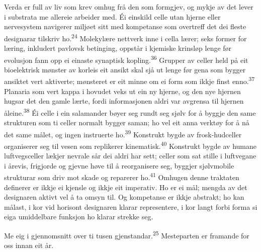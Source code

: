 \begin{widebody}
{Verda er full av liv som krev omhug frå den som formgjev, og mykje av det lever i substrata me allereie arbeider med. Éi einskild celle utan hjerne eller nervesystem navigerer miljøet sitt med kompetanse som overtreff det dei fleste designarar tilskriv ho.\textsuperscript{24} Molekylære nettverk inne i cella lærer; seks former for læring, inkludert pavlovsk betinging, oppstår i kjemiske krinsløp lenge før evolusjon fann opp ei einaste synaptisk kopling.\textsuperscript{36} Grupper av celler held på eit bioelektrisk mønster av korleis eit ansikt skal sjå ut lenge før gena som bygger ansiktet vert aktiverte; mønsteret er eit minne om ei form som ikkje finst enno.\textsuperscript{37} Planaria som vert kappa i hovudet veks ut ein ny hjerne, og den nye hjernen hugsar det den gamle lærte, fordi informasjonen aldri var avgrensa til hjernen åleine.\textsuperscript{38} Éi celle i ein salamander bøyer seg rundt seg sjølv for å byggje den same strukturen som ti celler normalt bygger saman; ho vel eit anna verktøy for å nå det same målet, og ingen instruerte ho.\textsuperscript{39} Konstrukt bygde av frosk-hudceller organiserer seg til vesen som replikerer kinematisk.\textsuperscript{40} Konstrukt bygde av humane luftvegsceller lækjer nevrale sår dei aldri har sett; celler som sat stille i luftvegane i årevis, frigjorde og gjevne høve til å reorganisere seg, byggjer sjølvmobile strukturar som driv mot skade og reparerer ho.\textsuperscript{41} Omhugen denne traktaten definerer er ikkje ei kjensle og ikkje eit imperativ. Ho er ei mål; mengda av det designaren aktivt vel å ta omsyn til. Og kompetanse er ikkje abstrakt; ho kan målast, i kor vid horisont designaren klarar representere, i kor langt forbi forma si eiga umiddelbare funksjon ho klarar strekke seg.

Me eig i gjennomsnitt over ti tusen gjenstandar.\textsuperscript{25} Mesteparten er framande for oss innan eit år.

}
\end{widebody}
